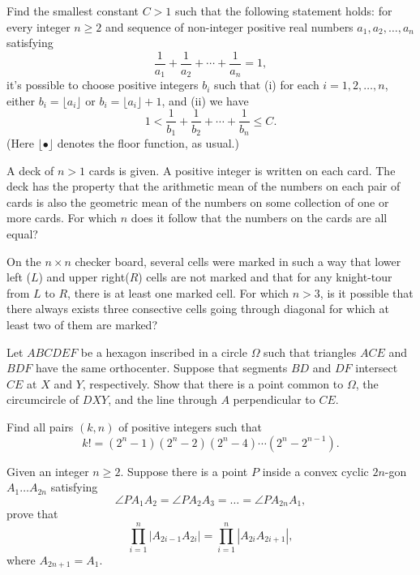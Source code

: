 \documentclass[11pt]{scrartcl}
\begin{document}
\begin{problem}[7229423492681245326]
Find the smallest constant $C > 1$ such that the following statement holds: for every integer $n \geq 2$ and sequence of non-integer positive real numbers $a_1, a_2, \dots, a_n$ satisfying$$\frac{1}{a_1} + \frac{1}{a_2} + \cdots + \frac{1}{a_n} = 1,$$it's possible to choose positive integers $b_i$ such that
(i) for each $i = 1, 2, \dots, n$, either $b_i = \lfloor a_i \rfloor$ or $b_i = \lfloor a_i \rfloor + 1$, and
(ii) we have$$1 < \frac{1}{b_1} + \frac{1}{b_2} + \cdots + \frac{1}{b_n} \leq C.$$(Here $\lfloor \bullet \rfloor$ denotes the floor function, as usual.)
\end{problem}
\begin{problem}[3859961452154270883]
	A deck of $n > 1$ cards is given. A positive integer is written on each card. The deck has the property that the arithmetic mean of the numbers on each pair of cards is also the geometric mean of the numbers on some collection of one or more cards.
For which $n$ does it follow that the numbers on the cards are all equal?
\end{problem}
\begin{problem}[409149115429190]
	On the $n\times n$ checker board, several cells were marked in such a way that lower left ($L$) and upper right($R$) cells are not marked and that for any knight-tour from $L$ to $R$, there is at least one marked cell. For which $n>3$, is it possible that there always exists three consective cells going through diagonal for which at least two of them are marked?
\end{problem}
\begin{problem}[639126468624733]
Let $ABCDEF$ be a hexagon inscribed in a circle $\Omega$ such that triangles $ACE$ and $BDF$ have the same orthocenter. Suppose that segments $BD$ and $DF$ intersect $CE$ at $X$ and $Y$, respectively. Show that there is a point common to $\Omega$, the circumcircle of $DXY$, and the line through $A$ perpendicular to $CE$.
\end{problem}
\begin{problem}[16776483958513]
Find all pairs $(k,n)$ of positive integers such that\[ k!=(2^n-1)(2^n-2)(2^n-4)\cdots(2^n-2^{n-1}). \]
\end{problem}
\begin{problem}[702587891849077]
	Given an integer $n \geqslant 2$. Suppose there is a point $P$ inside a convex cyclic $2n$-gon $A_1 \ldots A_{2n}$ satisfying$$\angle PA_1A_2 = \angle PA_2A_3 = \ldots = \angle PA_{2n}A_1,$$prove that$$ \prod_{i=1}^{n} \left|A_{2i - 1}A_{2i} \right| = \prod_{i=1}^{n} \left|A_{2i}A_{2i+1} \right|,$$where $A_{2n + 1} = A_1$.
\end{problem}
\end{document}
